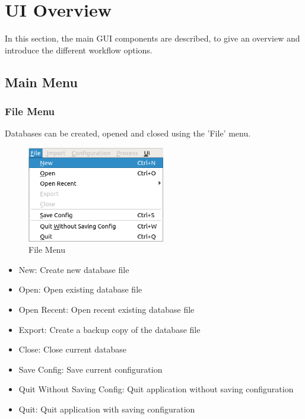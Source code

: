 
\chapter{UI Overview}
\label{sec:ui_overview}

In this section, the main GUI components are described, to give an overview and introduce the different workflow options.



\section{Main Menu}
\label{sec:main_menu}

\subsection{File Menu}
\label{sec:ui_overview_file_menu}

Databases can be created, opened and closed using the 'File' menu.

\begin{figure}[H]
  \center
    \includegraphics[width=6cm,frame]{figures/ui_file_menu.png}
  \caption{File Menu}
\end{figure}

\begin{itemize}
 \item New: Create new database file
 \item Open: Open existing database file
 \item Open Recent: Open recent existing database file
 \item Export: Create a backup copy of the database file
 \item Close: Close current database
 \item Save Config: Save current configuration
 \item Quit Without Saving Config: Quit application without saving configuration
 \item Quit: Quit application with saving configuration
\end{itemize}
\  \\

